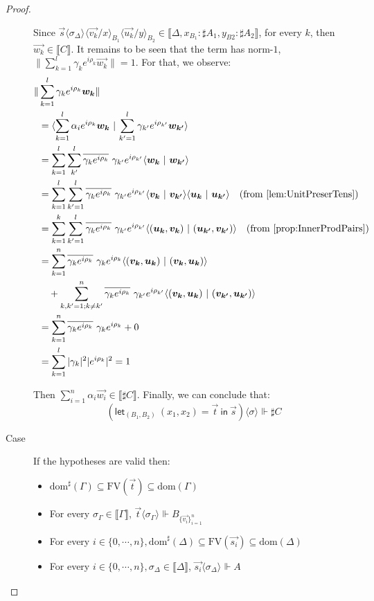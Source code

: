 \documentclass[runningheads,orivec,envcountsame,envcountsect]{llncs}
\newcommand\ansubst[2]{\ensuremath{\langle #1 \rangle_{#2}}}
\newcommand\dom[1]{\mathrm{dom}(#1)}
\newcommand\sdom[1]{\mathrm{dom}^{\sharp}(#1)}
\newcommand\FV[1]{\mathrm{FV}(#1)}
\def\scal#1#2{\langle{#1}~|~{#2}\rangle}
\def\Pair#1#2{(#1,#2)} %
\def\letkeyword{\mathsf{let}}
\def\inkeyword{\mathsf{in}}
\def\LetP#1#2#3#4#5#6{\letkeyword_{\Pair{#2}{#4}}~\Pair{#1}{#3}=#5~\inkeyword~#6}
\def\sem#1{\llbracket#1\rrbracket}
\def\real{\Vdash}
\newcommand\genbasis[3]{\ensuremath{B_{\{#1\}_{#2}^{#3}}}}
\begin{document}
\begin{proof}
\begin{description}
    Since $\vec{s}\ansubst{\sigma_\Delta}{}\ansubst{\vec{v_k}/x}{B_1}\ansubst{\vec{u_k}/y}{B_2}\in\sem{\Delta, x_{B_1}:\sharp A_1, y_{B2}:\sharp A_2}$, for every $k$, then $\vec{w_k}\in\sem{C}$. It remains to be seen that the term has norm-$1$, $\|\sum_{k=1}^{l}\gamma_k e^{i\rho_k} \vec{w_k}\|=1$. For that, we observe:
    \begin{align*}
        \|&\sum_{k=1}^{l}\gamma_k e^{i\rho_k} \vec{w_k}\| \\
        &= \scal{\sum_{k=1}^{l}\alpha_i e^{i\rho_k} \vec{w_k}}{\sum_{k'=1}^{l}\gamma_{k'} e^{i\rho_{k'}} \vec{w_{k'}}}\\
        &= \sum_{k=1}^{l}\sum_{k'}^{l}\overline{\gamma_k e^{i\rho_k}}\  \gamma_{k'} e^{i\rho_{k'}}\scal{\vec{w_k}}{\vec{w_{k'}}}\\
        &=\sum_{k=1}^{l}\sum_{k'=1}^{l}\overline{\gamma_k e^{i\rho_k}}\ \gamma_{k'} e^{i\rho_{k'}} \scal{\vec{v_k}}{\vec{v_{k'}}}\scal{\vec{u_k}}{\vec{u_{k'}}}\quad(\text{from \Cref{lem:UnitPreserTens}})\\
        &= \sum_{k=1}^{k}\sum_{k'=1}^{l}\overline{\gamma_k e^{i\rho_k}}\  \gamma_{k'} e^{i\rho_{k'}} \scal{\Pair{\vec{u_k}}{\vec{v_k}}}{\Pair{\vec{u_{k'}}}{\vec{v_{k'}}}}\quad(\text{from \Cref{prop:InnerProdPairs}})\\
        &=\sum_{k=1}^n \overline{\gamma_k e^{i\rho_k}}\ \gamma_k e^{i\rho_k} \scal{\Pair{\vec{v_k}}{\vec{u_k}}}{\Pair{\vec{v_k}}{\vec{u_k}}} \\
        & \quad + \sum_{k,k'=1; k\neq k'}^n \overline{\gamma_k e^{i\rho_k}}\  \gamma_{k'} e^{i\rho_{k'}} \scal{\Pair{\vec{v_k}}{\vec{u_k}}}{\Pair{\vec{v_{k'}}}{\vec{u_{k'}}}}\\
        &= \sum_{k=1}^n \overline{\gamma_k e^{i\rho_k}}\ \gamma_k e^{i\rho_k} + 0 \\
        &= \sum_{k=1}^{l} |\gamma_k|^2 |e^{i\rho_k}|^2 = 1
    \end{align*}

    Then $\sum_{i=1}^{n}\alpha_i\vec{w_i}\in\sem{\sharp C}$. Finally, we can conclude that: 
    \[(\LetP{x_1}{B_1}{x_2}{B_2}{\vec{t}}{\vec{s}})\ansubst{\sigma}{}\real{\sharp C}\]

    \item[Case] If the hypotheses are valid then:
    \begin{itemize}
        \item $\sdom{\Gamma}\subseteq \FV{\vec{t}}\subseteq \dom{\Gamma}$
        \item For every $\sigma_\Gamma\in\sem{\Gamma}$, $\vec{t}\ansubst{\sigma_\Gamma}{}\real\genbasis{\vec{v_i}}{i=1}{n}$
        \item For every $i\in\{0,\dotsb ,n\}, \sdom{\Delta}\subseteq \FV{\vec{s_i}}\subseteq \dom{\Delta}$
        \item For every $i\in\{0,\dotsb ,n\}, \sigma_\Delta\in\sem{\Delta}$, $\vec{s_i}\ansubst{\sigma_\Delta}{}\real A$
    \end{itemize}


\end{description}
\end{proof}
\end{document}
